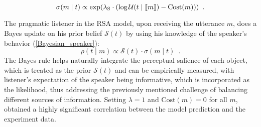 \begin{equation} \label{Bayesian_speaker}
\sigma(m \mid t) \propto \exp(\lambda_\mathrm{S} \cdot (\log \mathcal{U}(t\mid \llbracket m \rrbracket)-\mbox{Cost}(m))) \enspace .
\end{equation}

The pragmatic listener in the RSA model, upon receiving the utterance $m$, does a Bayes update on his prior belief $\mathcal{S}(t)$ by using his knowledge of the speaker's behavior (\ref{Bayesian_speaker}):
\begin{equation} \label{Bayesian_rec_update}
\rho(t \mid m) \propto \mathcal{S}(t)\cdot \sigma(m \mid t) \enspace .  
\end{equation}
The Bayes rule helps naturally integrate the perceptual salience of each object, which is treated as the prior $\mathcal{S}(t)$ and can be empirically measured, with listener's expectation of the speaker being informative, which is incorporated as the likelihood, thus addressing the previously mentioned challenge of balancing different sources of information. Setting $\lambda=1$ and $\mbox{Cost}(m)=0$ for all $m$, \cite{Frank} obtained a highly significant correlation between the model prediction and the experiment data.


